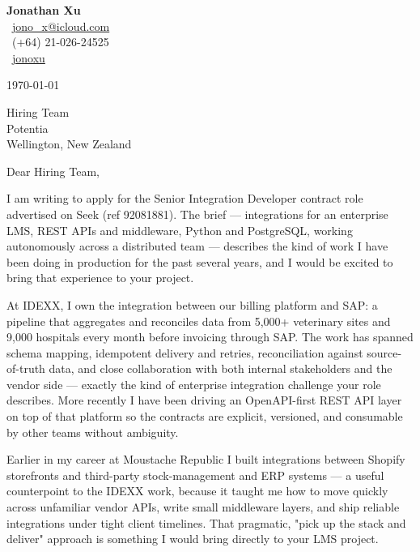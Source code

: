 \documentclass[11pt,a4paper]{article}
\begin{document}
\begin{flushright}
{\Large\textbf{Jonathan Xu}}\\[0.3em]
\faEnvelope\ \href{mailto:jono_x@icloud.com}{jono\_x@icloud.com} \\
\faPhone\ (+64) 21-026-24525 \\
\faLinkedin\ \href{https://www.linkedin.com/in/jonathan-x-4aba55115}{jonoxu}
\end{flushright}

\vspace{0.5em}

\today

\vspace{0.5em}

Hiring Team \\
Potentia \\
Wellington, New Zealand

\vspace{0.5em}

Dear Hiring Team,

I am writing to apply for the Senior Integration Developer contract role advertised on Seek (ref 92081881). The brief — integrations for an enterprise LMS, REST APIs and middleware, Python and PostgreSQL, working autonomously across a distributed team — describes the kind of work I have been doing in production for the past several years, and I would be excited to bring that experience to your project.

At IDEXX, I own the integration between our billing platform and SAP: a pipeline that aggregates and reconciles data from 5,000+ veterinary sites and 9,000 hospitals every month before invoicing through SAP. The work has spanned schema mapping, idempotent delivery and retries, reconciliation against source-of-truth data, and close collaboration with both internal stakeholders and the vendor side — exactly the kind of enterprise integration challenge your role describes. More recently I have been driving an OpenAPI-first REST API layer on top of that platform so the contracts are explicit, versioned, and consumable by other teams without ambiguity.

Earlier in my career at Moustache Republic I built integrations between Shopify storefronts and third-party stock-management and ERP systems — a useful counterpoint to the IDEXX work, because it taught me how to move quickly across unfamiliar vendor APIs, write small middleware layers, and ship reliable integrations under tight client timelines. That pragmatic, "pick up the stack and deliver" approach is something I would bring directly to your LMS project.
\end{document}
